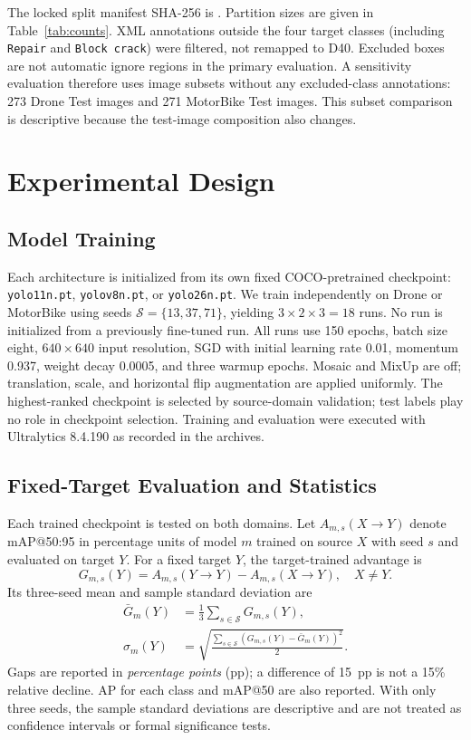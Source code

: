 \documentclass[conference,a4paper]{IEEEtran}
\begin{document}
The locked split manifest SHA-256 is \texttt{}. Partition sizes are given in Table~\ref{tab:counts}. XML annotations outside the four target classes (including \texttt{Repair} and \texttt{Block crack}) were filtered, not remapped to D40. Excluded boxes are not automatic ignore regions in the primary evaluation. A sensitivity evaluation therefore uses image subsets without any excluded-class annotations: 273 Drone Test images and 271 MotorBike Test images. This subset comparison is descriptive because the test-image composition also changes.

\section{Experimental Design}
\subsection{Model Training}
Each architecture is initialized from its own fixed COCO-pretrained checkpoint: \texttt{yolo11n.pt}, \texttt{yolov8n.pt}, or \texttt{yolo26n.pt}. We train independently on Drone or MotorBike using seeds $\mathcal{S}=\{13,37,71\}$, yielding $3\times2\times3=18$ runs. No run is initialized from a previously fine-tuned run. All runs use 150 epochs, batch size eight, $640\times640$ input resolution, SGD with initial learning rate 0.01, momentum 0.937, weight decay 0.0005, and three warmup epochs. Mosaic and MixUp are off; translation, scale, and horizontal flip augmentation are applied uniformly. The highest-ranked checkpoint is selected by source-domain validation; test labels play no role in checkpoint selection. Training and evaluation were executed with Ultralytics 8.4.190 as recorded in the archives.

\subsection{Fixed-Target Evaluation and Statistics}
Each trained checkpoint is tested on both domains. Let $A_{m,s}(X\!\rightarrow\!Y)$ denote mAP@50:95 in percentage units of model $m$ trained on source $X$ with seed $s$ and evaluated on target $Y$. For a fixed target $Y$, the target-trained advantage is
\begin{equation}
G_{m,s}(Y)=A_{m,s}(Y\!\rightarrow\!Y)-A_{m,s}(X\!\rightarrow\!Y),\quad X\ne Y.
\label{eq:gap}
\end{equation}
Its three-seed mean and sample standard deviation are
\begin{align}
\bar{G}_m(Y)&=\frac{1}{3}\sum_{s\in\mathcal S}G_{m,s}(Y), \\[-2pt]
\sigma_m(Y)&=\sqrt{\frac{\sum_{s\in\mathcal S}(G_{m,s}(Y)-\bar G_m(Y))^2}{2}}.
\label{eq:std}
\end{align}
Gaps are reported in \emph{percentage points} (pp); a difference of 15~pp is not a 15\% relative decline. AP for each class and mAP@50 are also reported. With only three seeds, the sample standard deviations are descriptive and are not treated as confidence intervals or formal significance tests.
\end{document}
